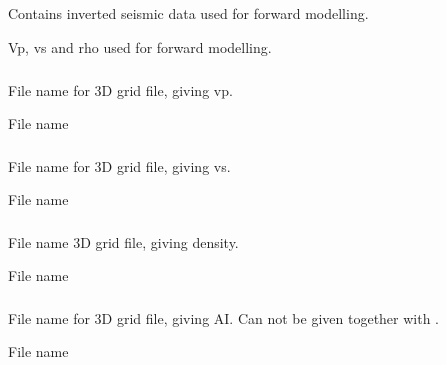 \subsection{}
 \slist
   \item \Description Contains inverted seismic data used for forward modelling.
   \item \Argument Vp, vs and rho used for forward modelling.
   \item \Default
 \elist

\subsubsection{}
 \slist
   \item \Description File name for 3D grid file, giving vp.
   \item \Argument File name
   \item \Default
 \elist

\subsubsection{}
 \slist
   \item \Description File name for 3D grid file, giving vs.
   \item \Argument File name
   \item \Default
 \elist

\subsubsection{}
 \slist
   \item \Description File name 3D grid file, giving density.
   \item \Argument File name
   \item \Default
 \elist

\subsubsection{}
 \slist
   \item \Description File name for 3D grid file, giving AI. Can not
     be given together with  .
   \item \Argument File name
   \item \Default
 \elist

